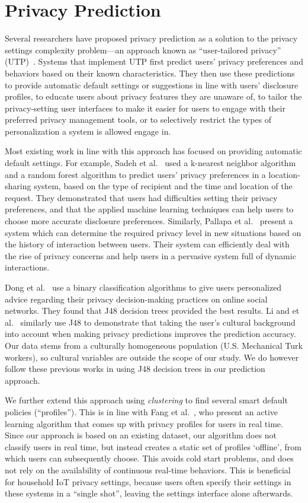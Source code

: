 \section{Privacy Prediction}
Several researchers have proposed privacy prediction as a solution to the privacy settings complexity problem---an approach known as ``user-tailored privacy'' (UTP)~\cite{knijnenburg2017}. Systems that implement UTP first predict users' privacy preferences and behaviors based on their known characteristics. They then use these predictions to provide automatic default settings or suggestions in line with users' disclosure profiles, to educate users about privacy features they are unaware of, to tailor the privacy-setting user interfaces to make it easier for users to engage with their preferred privacy management tools, or to selectively restrict the types of personalization a system is allowed engage in.

Most existing work in line with this approach has focused on providing automatic default settings. For example, Sadeh et al.~\cite{sadeh2009understanding} used a k-nearest neighbor algorithm and a random forest algorithm to predict users' privacy preferences in a location-sharing system, based on the type of recipient and the time and location of the request. They demonstrated that users had difficulties setting their privacy preferences, and that the applied machine learning techniques can help users to choose more accurate disclosure preferences. Similarly, Pallapa et al.~\cite{pallapa2014adaptive} present a system which can determine the required privacy level in new situations based on the history of interaction between users. Their system can efficiently deal with the rise of privacy concerns and help users in a pervasive system full of dynamic interactions.

Dong et al.~\cite{dong2016ppm} use a binary classification algorithms to give users personalized advice regarding their privacy decision-making practices on online social networks. They found that J48 decision trees provided the best results. Li and et al.~\cite{li2017cross} similarly use J48 to demonstrate that taking the user's cultural background into account when making privacy predictions improves the prediction accuracy. Our data stems from a culturally homogeneous population (U.S. Mechanical Turk workers), so cultural variables are outside the scope of our study. We do however follow these previous works in using J48 decision trees in our prediction approach.

We further extend this approach using \emph{clustering} to find several smart default policies (``profiles''). This is in line with Fang et al.~\cite{fang2010privacy}, who present an active learning algorithm that comes up with privacy profiles for users in real time. Since our approach is based on an existing dataset, our algorithm does not classify users in real time, but instead creates a static set of profiles `offline', from which users can subsequently choose. This avoids cold start problems, and does not rely on the availability of continuous real-time behaviors. This is beneficial for household IoT privacy settings, because users often specify their settings in these systems in a ``single shot'', leaving the settings interface alone afterwards.

